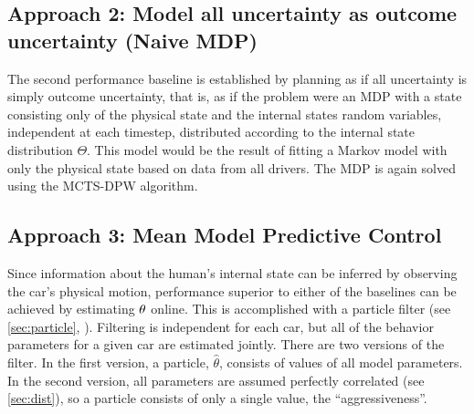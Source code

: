 \subsection{Approach 2: Model all uncertainty as outcome uncertainty (Naive MDP)}

The second performance baseline is established by planning as if all uncertainty is simply outcome uncertainty, that is, as if the problem were an MDP with a state consisting only of the physical state and the internal states random variables, independent at each timestep, distributed according to the internal state distribution $\Theta$. 
This model would be the result of fitting a Markov model with only the physical state based on data from all drivers.
The MDP is again solved using the MCTS-DPW algorithm.

\subsection{Approach 3: Mean Model Predictive Control} \label{sec:mpc}

Since information about the human's internal state can be inferred by observing the car's physical motion, performance superior to either of the baselines can be achieved by estimating $\theta$ online.
This is accomplished with a particle filter (see \cref{sec:particle}, \cite{thrun2005probabilistic}).
Filtering is independent for each car, but all of the behavior parameters for a given car are estimated jointly.
There are two versions of the filter.
In the first version, a particle, $\hat{\theta}$, consists of values of all model parameters.
In the second version, all parameters are assumed perfectly correlated (see \cref{sec:dist}), so a particle consists of only a single value, the ``aggressiveness''.

